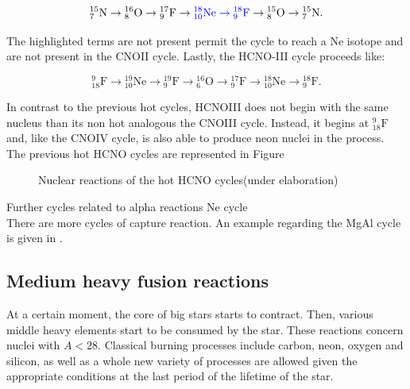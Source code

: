 \documentclass[openany]{book}
\begin{document}
\begin{equation} \label{eq:reaction_HCNO_N}
	\mathrm{{}_{7}^{15}N  \rightarrow {}^{16}_{8}O  \rightarrow {}^{17}_{9}F  \rightarrow \textcolor{blue}{{}^{18}_{10}Ne  \rightarrow {}^{18}_{9}F}  \rightarrow {}^{15}_{8}O \rightarrow {}^{15}_{7}N  }.
\end{equation}

The highlighted terms are not present permit the cycle to reach a Ne isotope and are not present in the CNOII cycle. Lastly, the HCNO-III cycle proceeds like: 

\begin{equation} \label{eq:reaction_HCNO_O}
	\mathrm{{}_{18}^{9}F  \rightarrow {}^{19}_{10}Ne  \rightarrow {}^{19}_{9}F  \rightarrow {}^{16}_{6}O  \rightarrow {}^{17}_{9}F  \rightarrow {}^{18}_{10}Ne \rightarrow {}^{18}_{9}F  }.
\end{equation}

In contrast to the previous hot cycles, HCNOIII does not begin with the same nucleus than its non hot analogous the CNOIII cycle. Instead, it begins at $\mathrm{{}_{18}^{9}F}$ and, like the CNOIV cycle, is also able to produce neon nuclei in the process. \\

The previous hot HCNO cycles are represented in Figure 

\begin{figure}[H]
	
	\caption[Nuclear reactions of the HCNO cycles ]{Nuclear reactions of the hot HCNO cycles(under elaboration)}
	\label{fig:nuclerReactionppHCNO}
\end{figure}

Further cycles related to alpha reactions Ne cycle \cite{kaeppeler_wiescher_giesen_goerres_baraffe_eleid_raiteri_busso_gallino_limongi_et_1994}\\

There are more cycles of capture reaction. An example regarding the MgAl cycle is given in \cite{lotay_doherty_janssens_seweryniak_albers_almaraz-calderon_carpenter_champagne_chiara_hoffman_et_2022}.


\subsection{Medium heavy fusion reactions} \label{sub:mediumHeavyReactions}

At a certain moment, the core of big stars starts to contract. Then, various middle heavy elements start to be consumed by the star. These reactions concern nuclei with $A < 28$. Classical burning processes include carbon, neon, oxygen and silicon, as well as a whole new variety of processes are allowed given the appropriate conditions at the last period of the lifetime of the star. \\
\end{document}
